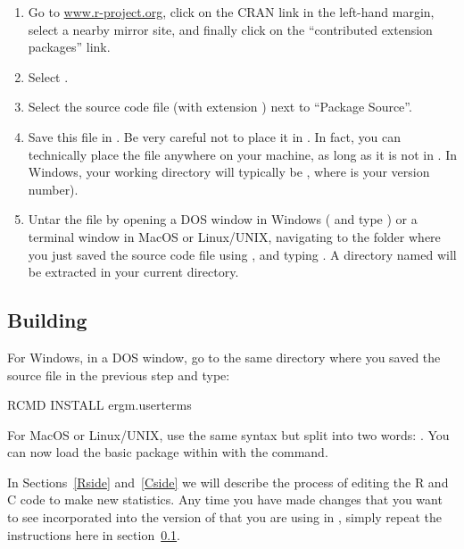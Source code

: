 \documentclass[nojss]{jss}
\begin{document}
\begin{enumerate}
\item Go to \url{www.r-project.org}, click on the CRAN link in the left-hand margin,
select a nearby mirror site, and finally click on the ``contributed extension packages''
link.
\item Select .
\item Select the source code file (with extension ) next to ``Package Source''.
\item Save this file in .  Be very careful not to place it in . In fact, you can technically place the file anywhere on your machine, as long as it is not in .  In Windows, your  working directory will typically be , where  is your  version number).
\item Untar the file by opening a DOS window in
Windows ( and type ) or a terminal window in
MacOS or Linux/UNIX,
navigating to the folder where you just saved the source code file
using , and typing .
A directory named  will be extracted in your current directory.
\end{enumerate}

\subsection[Building ergm.userterms]{Building }
\label{BuildEUT}

For Windows, in a DOS window, go to the same directory where you saved the  source file in the previous step and type:
\begin{CodeChunk}
\begin{CodeInput}
RCMD INSTALL ergm.userterms
\end{CodeInput}
\end{CodeChunk}
For MacOS or Linux/UNIX, use the same syntax but split 
into two words: .
You can now load the basic  package within  with the  command.

In Sections~\ref{Rside} and~\ref{Cside} we will describe the process of editing the R and C code to make new statistics.  Any time you have made changes that you want to see incorporated into the version of  that you are using in , simply repeat the instructions here in section~\ref{BuildEUT}.
\end{document}
